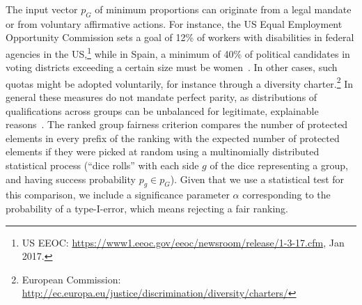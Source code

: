 The input vector $p_G$ of minimum proportions can originate from a legal mandate or from voluntary affirmative actions.
%
For instance, the US Equal Employment Opportunity Commission sets a goal of 12\% of workers with disabilities in federal agencies in the US,\footnote{US EEOC: \url{https://www1.eeoc.gov/eeoc/newsroom/release/1-3-17.cfm}, Jan 2017.}
%
while in Spain, a minimum of 40\% of political candidates in voting districts exceeding a certain size must be women~\cite{verge2010gendering}.
%
In other cases, such quotas might be adopted voluntarily, for instance through a diversity charter.\footnote{European Commission: \url{http://ec.europa.eu/justice/discrimination/diversity/charters/}}
%
In general these measures do not mandate perfect parity, as distributions of qualifications across groups can be unbalanced for legitimate, explainable reasons~\cite{zliobaite2011handling,pedreschi2009integrating}. %
%
The ranked group fairness criterion compares the number of protected elements in every prefix of the ranking with the expected number of protected elements if they were picked at random using a multinomially distributed statistical process (``dice rolls'' with each side $g$ of the dice representing a group, and having success probability $p_g \in p_G$).
%
Given that we use a statistical test for this comparison, we include a significance parameter $\alpha$ corresponding to the probability of a type-I-error, which means rejecting a fair ranking.
%


